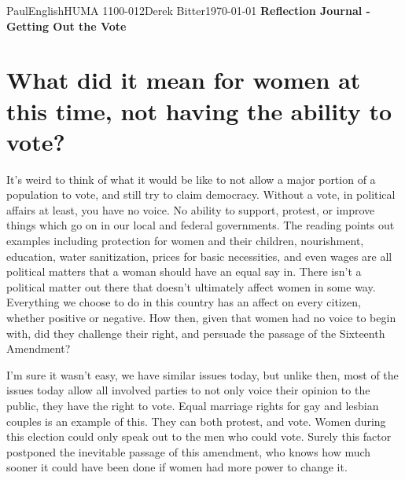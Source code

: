 \documentclass[12pt,letterpaper]{article}
\begin{document}
\begin{mla}{Paul}{English}{HUMA 1100-012}{Derek
    Bitter}{\today}    
    {\textbf{Reflection Journal - Getting Out the Vote}}

\section*{What did it mean for women at this time, not having the ability to vote?}

It's weird to think of what it would be like to not allow a major portion of a population to vote, and still try to claim democracy. Without a vote, in political affairs at least, you have no voice. No ability to support, protest, or improve things which go on in our local and federal governments. The reading points out examples including protection for women and their children, nourishment, education, water sanitization, prices for basic necessities, and even wages are all political matters that a woman should have an equal say in. There isn't a political matter out there that doesn't ultimately affect women in some way. Everything we choose to do in this country has an affect on every citizen, whether positive or negative. How then, given that women had no voice to begin with, did they challenge their right, and persuade the passage of the Sixteenth Amendment?

I'm sure it wasn't easy, we have similar issues today, but unlike then, most of the issues today allow all involved parties to not only voice their opinion to the public, they have the right to vote. Equal marriage rights for gay and lesbian couples is an example of this. They can both protest, and vote. Women during this election could only speak out to the men who could vote. Surely this factor postponed the inevitable passage of this amendment, who knows how much sooner it could have been done if women had more power to change it.


\end{mla}
\end{document}
